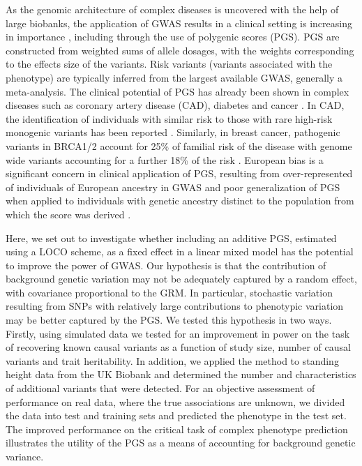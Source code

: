 \documentclass[doublespacing]{bmcart}
\begin{document}
As the genomic architecture of complex diseases is uncovered with the help of large biobanks, the application of GWAS results in a clinical setting is increasing in importance \cite{tam2019benefits}, including through the use of polygenic scores (PGS). PGS are constructed from weighted sums of allele dosages, with the weights corresponding to the effects size of the variants. Risk variants (variants associated with the phenotype) are typically inferred from the largest available GWAS, generally a meta-analysis. The clinical potential of PGS has already been shown in complex diseases such as coronary artery disease (CAD), diabetes and cancer  \cite{khera2018genome, torkamani2018personal, yanes2020clinical}. In CAD, the identification of individuals with similar risk to those with rare high-risk monogenic variants has been reported \cite{khera2018genome}. Similarly, in breast cancer, pathogenic variants in BRCA1/2 account for 25\% of familial risk of the disease with genome wide variants accounting for a further 18\% of the risk \cite{michailidou2017association,bahcall2013common}. European bias is a significant concern in clinical application of PGS, resulting from over-represented of individuals of European ancestry in GWAS and poor generalization of PGS when applied to individuals with genetic ancestry distinct to the population from which the score was derived \cite{lambert2019towards,duncan2019analysis}.  

\par

Here, we set out to investigate whether including an additive PGS, estimated using a LOCO scheme, as a fixed effect in a linear mixed model has the potential to improve the power of GWAS. Our hypothesis is that the contribution of background genetic variation may not be adequately captured by a random effect, with covariance proportional to the GRM. In particular, stochastic variation resulting from SNPs with relatively large contributions to phenotypic variation may be better captured by the PGS. We tested this hypothesis in two ways. Firstly, using simulated data we tested for an improvement in power on the task of recovering known causal variants as a function of study size, number of causal variants and trait heritability. In addition, we applied the method to standing height data from the UK Biobank and determined the number and characteristics of additional variants that were detected. For an objective assessment of performance on real data, where the true associations are unknown, we divided the data into test and training sets and predicted the phenotype in the test set. The improved performance on the critical task of complex phenotype prediction illustrates the utility of the PGS as a means of accounting for background genetic variance.
\end{document}
